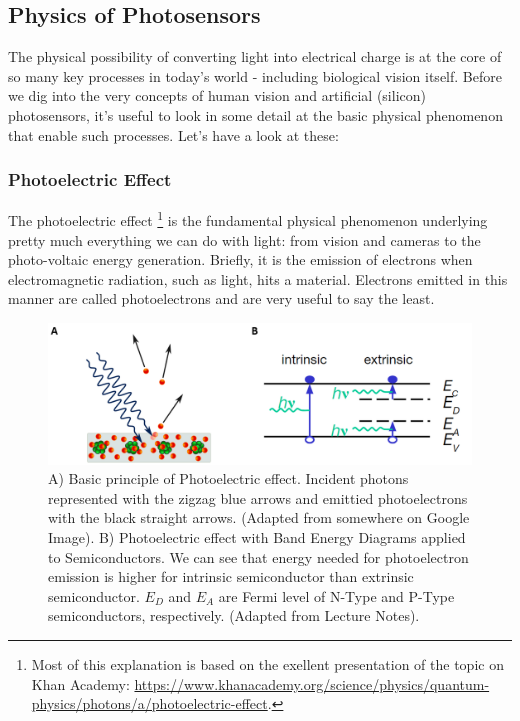 \subsection{Physics of Photosensors}

The physical possibility of converting light into electrical charge is at the core of so many key processes in today's world - including biological vision itself. Before we dig into the very concepts of human vision and artificial (silicon) photosensors, it's useful to look in some detail at the basic physical phenomenon that enable such processes. Let's have a look at these:

\subsubsection{Photoelectric Effect}

The photoelectric effect \footnote{Most of this explanation is based on the exellent presentation of the topic on Khan Academy: \url{https://www.khanacademy.org/science/physics/quantum-physics/photons/a/photoelectric-effect}.} is the fundamental physical phenomenon underlying pretty much everything we can do with light: from vision and cameras to the photo-voltaic energy generation. Briefly, it is the emission of electrons when electromagnetic radiation, such as light, hits a material. Electrons emitted in this manner are called photoelectrons and are very useful to say the least. 

\begin{figure}[H]
    \centering
    \includegraphics[width=0.9\linewidth]{../../Figures/PhotoElectricEffect.PNG}
    \caption{A) Basic principle of Photoelectric effect. Incident photons represented with the zigzag blue arrows and emittied photoelectrons with the black straight arrows. (Adapted from somewhere on Google Image). B) Photoelectric effect with Band Energy Diagrams applied to Semiconductors. We can see that energy needed for photoelectron emission is higher for intrinsic semiconductor than extrinsic semiconductor. $E_D$ and $E_A$ are Fermi level of N-Type and P-Type semiconductors, respectively. (Adapted from Lecture Notes).}
    \label{fig:PhotoElectricEffect}
\end{figure}

